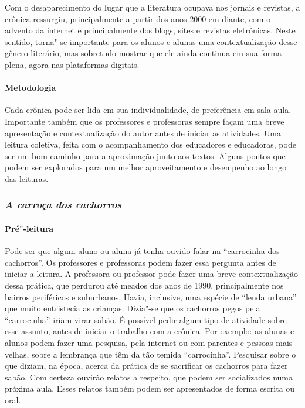 \documentclass{extarticle}
\begin{document}
Com o desaparecimento do lugar que a literatura ocupava nos jornais e
revistas, a crônica ressurgiu, principalmente a partir dos anos 2000 em
diante, com o advento da internet e principalmente dos blogs, sites e
revistas eletrônicas. Neste sentido, torna"-se importante para os alunos
e alunas uma contextualização desse gênero literário, mas sobretudo
mostrar que ele ainda continua em sua forma plena, agora nas plataformas
digitais.


\paragraph{Metodologia} Cada crônica pode ser lida em sua individualidade,
de preferência em sala aula. Importante também que os professores e
professoras sempre façam uma breve apresentação e contextualização do
autor antes de iniciar as atividades. Uma leitura coletiva, feita com o
acompanhamento dos educadores e educadoras, pode ser um bom caminho para
a aproximação junto aos textos. Alguns pontos que podem ser explorados
para um melhor aproveitamento e desempenho ao longo das leituras.

\subsubsection{\textit{A carroça dos cachorros}}

\paragraph{Pré"-leitura}

Pode ser que algum aluno ou aluna já tenha ouvido falar na
``carrocinha dos cachorros''. Os professores e professoras podem fazer
essa pergunta antes de iniciar a leitura. A professora ou professor pode
fazer uma breve contextualização dessa prática, que perdurou até meados
dos anos de 1990, principalmente nos bairros periféricos e suburbanos.
Havia, inclusive, uma espécie de ``lenda urbana'' que muito entristecia
as crianças. Dizia"-se que os cachorros pegos pela ``carrocinha'' iriam
virar sabão. É possível pedir algum tipo de atividade sobre esse
assunto, antes de iniciar o trabalho com a crônica. Por exemplo: as
alunas e alunos podem fazer uma pesquisa, pela internet ou com parentes
e pessoas mais velhas, sobre a lembrança que têm da tão temida
``carrocinha''. Pesquisar sobre o que diziam, na época, acerca da
prática de se sacrificar os cachorros para fazer sabão. Com certeza
ouvirão relatos a respeito, que podem ser socializados numa próxima
aula. Esses relatos também podem ser apresentados de forma escrita ou
oral.
\end{document}
